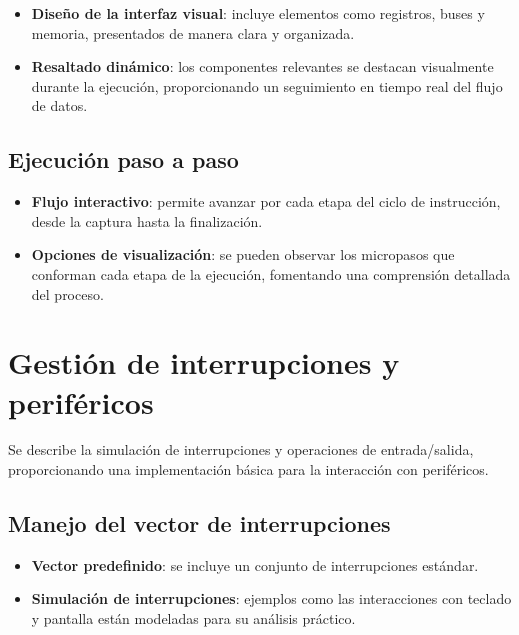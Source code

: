 \documentclass[12pt,oneside]{templates/unerthesis}
\providecommand{\tightlist}{%
  \setlength{\itemsep}{0pt}\setlength{\parskip}{0pt}}
\begin{document}
\begin{itemize}
\tightlist
\item
  \textbf{Diseño de la interfaz visual}: incluye elementos como registros, buses y memoria, presentados de manera clara y organizada.
\item
  \textbf{Resaltado dinámico}: los componentes relevantes se destacan visualmente durante la ejecución, proporcionando un seguimiento en tiempo real del flujo de datos.
\end{itemize}

\hypertarget{ejecuciuxf3n-paso-a-paso}{%
\subsection{Ejecución paso a paso}\label{ejecuciuxf3n-paso-a-paso}}

\begin{itemize}
\tightlist
\item
  \textbf{Flujo interactivo}: permite avanzar por cada etapa del ciclo de instrucción, desde la captura hasta la finalización.
\item
  \textbf{Opciones de visualización}: se pueden observar los micropasos que conforman cada etapa de la ejecución, fomentando una comprensión detallada del proceso.
\end{itemize}

\hypertarget{gestiuxf3n-de-interrupciones-y-perifuxe9ricos}{%
\section{Gestión de interrupciones y periféricos}\label{gestiuxf3n-de-interrupciones-y-perifuxe9ricos}}

Se describe la simulación de interrupciones y operaciones de entrada/salida, proporcionando una implementación básica para la interacción con periféricos.

\hypertarget{manejo-del-vector-de-interrupciones}{%
\subsection{Manejo del vector de interrupciones}\label{manejo-del-vector-de-interrupciones}}

\begin{itemize}
\tightlist
\item
  \textbf{Vector predefinido}: se incluye un conjunto de interrupciones estándar.
\item
  \textbf{Simulación de interrupciones}: ejemplos como las interacciones con teclado y pantalla están modeladas para su análisis práctico.
\end{itemize}
\end{document}
